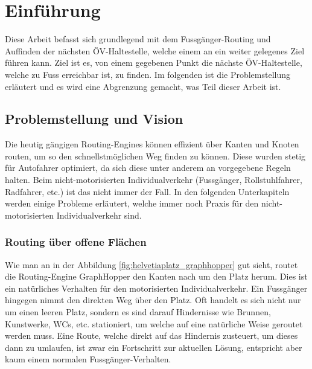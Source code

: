 \section{Einführung}
\label{Einführung}
Diese Arbeit befasst sich grundlegend mit dem Fussgänger-Routing und Auffinden der nächsten ÖV-Haltestelle, welche einem an ein weiter gelegenes Ziel führen kann. Ziel ist es, von einem gegebenen Punkt die nächste ÖV-Haltestelle, welche zu Fuss erreichbar ist, zu finden. Im folgenden ist die Problemstellung erläutert und es wird eine Abgrenzung gemacht, was Teil dieser Arbeit ist.

\subsection{Problemstellung und Vision}
\label{Problemstellung und Vision}
Die heutig gängigen Routing-Engines können effizient über Kanten und Knoten routen, um so den schnellstmöglichen Weg finden zu können. Diese wurden stetig für Autofahrer optimiert, da sich diese unter anderem an vorgegebene Regeln halten. Beim nicht-motorisierten Individualverkehr (Fussgänger, Rollstuhlfahrer, Radfahrer, etc.)  ist das nicht immer der Fall. In den folgenden Unterkapiteln werden einige Probleme erläutert, welche immer noch Praxis für den nicht-motorisierten Individualverkehr sind.

\subsubsection{Routing über offene Flächen}
\label{problem:Routing über offene Flächen}
Wie man an in der Abbildung \ref{fig:helvetiaplatz_graphhopper} gut sieht, routet die Routing-Engine GraphHopper den Kanten nach um den Platz herum. Dies ist ein natürliches Verhalten für den motorisierten Individualverkehr. Ein Fussgänger hingegen nimmt den direkten Weg über den Platz. Oft handelt es sich nicht nur um einen leeren Platz, sondern es sind darauf Hindernisse wie Brunnen, Kunstwerke, WCs, etc. stationiert, um welche auf eine natürliche Weise geroutet werden muss. Eine Route, welche direkt auf das Hindernis zusteuert, um dieses dann zu umlaufen, ist zwar ein Fortschritt zur aktuellen Lösung, entspricht aber kaum einem normalen Fussgänger-Verhalten. 

